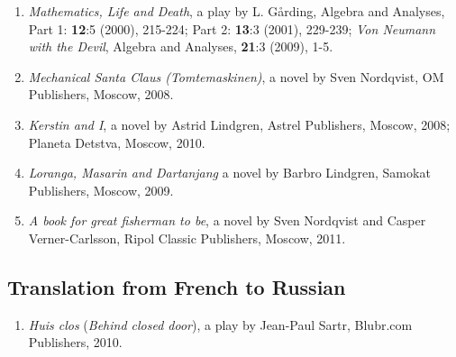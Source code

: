\documentclass{article}
\begin{document}
\begin{enumerate}
\item {\it Mathematics, Life and Death}, a play by L. G{\aa}rding,
Algebra and Analyses,  Part 1: {\bf 12}:5 (2000), 215-224; Part 2:
{\bf 13}:3
(2001), 229-239; {\it Von Neumann with the Devil}, Algebra and Analyses, {\bf 21}:3 (2009), 1-5.

\item {\it Mechanical Santa Claus (Tomtemaskinen)}, a novel by Sven Nordqvist, OM Publishers, Moscow, 2008.


\item {\it Kerstin and I}, a novel by Astrid Lindgren, Astrel Publishers, Moscow, 2008; Planeta Detstva, Moscow, 2010.

\item  {\it Loranga, Masarin and Dartanjang} a novel by Barbro Lindgren, Samokat Publishers, Moscow, 2009.

\item {\it A book for great fisherman to be}, a novel by Sven Nordqvist and Casper Verner-Carlsson, Ripol Classic Publishers, Moscow, 2011.
\end{enumerate}

\subsection*{Translation  from French to Russian}
\begin{enumerate}
\item {\it Huis clos} ({\it Behind closed door}), a play by Jean-Paul Sartr, Blubr.com Publishers, 2010.
\end{enumerate}
\end{document}

